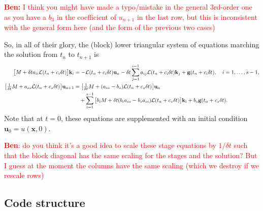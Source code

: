 \documentclass[a4paper,10pt]{article}
\begin{document}
\textcolor{red}{\textbf{Ben:} I think you might have made a typo/mistake in the general 3rd-order one as you have a $b_3$ in the coefficient of $u_{n+1}$ in the last row, but this is inconsistent with the general form here (and the form of the previous two cases)}

So, in all of their glory, the (block) lower triangular system of equations marching the solution from $t_n$ to $t_{n+1}$ is
\begin{align*}
\big[ M + \delta t a_{ii} {\cal L}(t_n + c_i \delta t) \big] \mathbf{k}_i 
&= 
- {\cal L}(t_n + c_i \delta t) \mathbf{u}_{n} 
- \delta t \sum \limits_{j = 1}^{i-1} a_{ij} {\cal L}(t_n + c_i \delta t) \mathbf{k}_{j} 
+ \mathbf{g}(t_n + c_i \delta t),
\quad
i = 1,\ldots,s-1, \\
\big[ 
\tfrac{1}{\delta t} M + a_{ss} {\cal L}(t_n + c_s \delta t) 
\big] 
\mathbf{u}_{n+1} 
&= 
\big[ 
\tfrac{1}{\delta t} M + ( a_{ss} - b_s) {\cal L}(t_n + c_s \delta t) 
\big] 
\mathbf{u}_{n} \\
&\quad
+ \sum \limits_{i = 1}^{s-1} 
\big[
b_i M + \delta t  (b_i a_{ss} - b_s a_{si}) {\cal L}(t_n + c_s \delta t)
\big] \mathbf{k}_i
+
b_s \mathbf{g}(t_n + c_s \delta t).
\end{align*}
Note that at $t = 0$, these equations are supplemented with an initial condition $\mathbf{u}_0 = u(\mathbf{x},0)$.

\textcolor{red}{\textbf{Ben}: do you think it's a good idea to scale these stage equations by $1/\delta t$ such that the block diagonal has the same scaling for the stages and the solution? But I guess at the moment the columns have the same scaling (which we destroy if we rescale rows)}

\subsection{Code structure}
\end{document}
